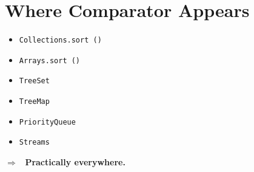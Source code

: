 \documentclass[11pt,a4paper]{book}
\begin{document}
\section{Where Comparator Appears}

\begin{itemize}
    \item \textcolor{RosettaBlue}{\texttt{Collections.sort ()}}
    \item \textcolor{RosettaBlue}{\texttt{Arrays.sort ()}}
    \item \textcolor{RosettaBlue}{\texttt{TreeSet}}
    \item \textcolor{RosettaBlue}{\texttt{TreeMap}}
    \item \textcolor{RosettaBlue}{\texttt{PriorityQueue}}
    \item \textcolor{RosettaBlue}{\texttt{Streams}}
\end{itemize}

\noindent
\textcolor{RosettaJade}{$\Rightarrow$}
\ \textbf{Practically everywhere.}

















\end{document}
